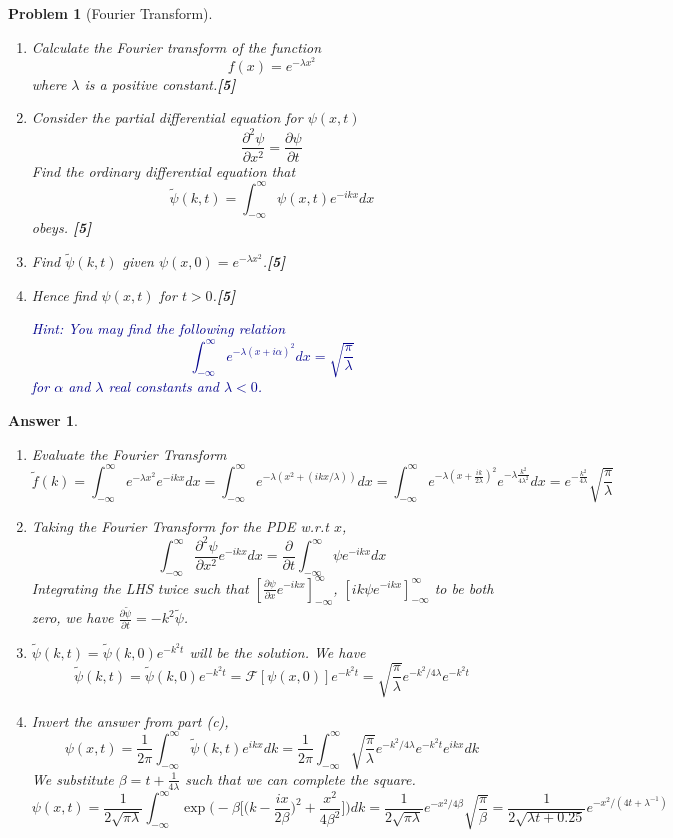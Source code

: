 \documentclass[a4paper]{article}
\newtheorem{ans}{Answer}[section]
\theoremstyle{new}
\newtheorem{qns}{Problem}[section]
\begin{document}
\newpage
\begin{qns}[Fourier Transform]\leavevmode
\begin{enumerate}[label=(\alph*)]
\item Calculate the Fourier transform of the function
$$f(x)=e^{-\lambda x^2}$$
where $\lambda$ is a positive constant.\hfill \textbf{[5]}
\item Consider the partial differential equation for $\psi(x,t)$
$$\frac{\partial^2\psi}{\partial x^2}=\frac{\partial\psi}{\partial t}$$
Find the ordinary differential equation that
$$\tilde{\psi}(k,t)=\int_{-\infty}^\infty\psi(x,t)e^{-ikx}dx$$
obeys. \hfill \textbf{[5]}
\item Find $\tilde{\psi}(k,t)$ given $\psi(x,0)=e^{-\lambda x^2}$.\hfill \textbf{[5]}
\item Hence find $\psi(x,t)$ for $t>0$.\hfill \textbf{[5]}
\begin{mdframed}
\textcolor{darkblue}{Hint: You may find the following relation 
$$\int_{-\infty}^\infty e^{-\lambda(x+i\alpha)^2}dx=\sqrt{\frac{\pi}{\lambda}}$$
for $\alpha$ and $\lambda$ real constants and $\lambda<0$.}
\end{mdframed}
\end{enumerate}
\end{qns}
\begin{ans}\begin{enumerate}[label=(\alph*)]
\item Evaluate the Fourier Transform
$$\tilde{f}(k)=\int_{-\infty}^\infty e^{-\lambda x^2}e^{-ikx}dx=\int_{-\infty}^\infty e^{-\lambda(x^2+(ikx/\lambda))}dx=\int_{-\infty}^\infty e^{-\lambda(x+\frac{ik}{2\lambda})^2}e^{-\lambda\frac{k^2}{4\lambda^2}}dx=e^{-\frac{k^2}{4\lambda}}\sqrt{\frac{\pi}{\lambda}}$$
\item Taking the Fourier Transform for the PDE w.r.t $x$,
$$\int_{-\infty}^\infty\frac{\partial^2\psi}{\partial x^2}e^{-ikx}dx=\frac{\partial}{\partial t}\int_{-\infty}^\infty\psi e^{-ikx}dx$$
Integrating the LHS twice such that $[\frac{\partial\psi}{\partial x}e^{-ikx}]_{-\infty}^\infty$, $[ik\psi e^{-ikx}]_{-\infty}^\infty$ to be both zero, we have $\frac{\partial\tilde{\psi}}{\partial t}=-k^2\tilde{\psi}$.
\item $\tilde{\psi}(k,t)=\tilde{\psi}(k,0)e^{-k^2t}$ will be the solution. We have
$$\tilde{\psi}(k,t)=\tilde{\psi}(k,0)e^{-k^2t}=\mathcal{F}[\psi(x,0)]e^{-k^2t}=\sqrt{\frac{\pi}{\lambda}}e^{-k^2/4\lambda}e^{-k^2t}$$
\item Invert the answer from part (c),
$$\psi(x,t)=\frac{1}{2\pi}\int_{-\infty}^\infty\tilde{\psi}(k,t)e^{ikx}dk=\frac{1}{2\pi}\int_{-\infty}^\infty\sqrt{\frac{\pi}{\lambda}}e^{-k^2/4\lambda}e^{-k^2t}e^{ikx}dk$$
We substitute $\beta=t+\frac{1}{4\lambda}$ such that we can complete the square.
$$\psi(x,t)=\frac{1}{2\sqrt{\pi\lambda}}\int_{-\infty}^{\infty}\exp\bigg(-\beta\bigg[\bigg(k-\frac{ix}{2\beta}\bigg)^2+\frac{x^2}{4\beta^2}\bigg]\bigg)dk=\frac{1}{2\sqrt{\pi\lambda}}e^{-x^2/4\beta}\sqrt{\frac{\pi}{\beta}}=\frac{1}{2\sqrt{\lambda t+0.25}}e^{-x^2/(4t+\lambda^{-1})}$$
\end{enumerate}
\end{ans}
\end{document}
